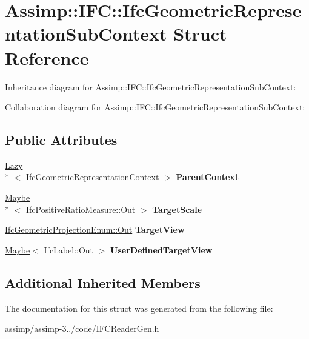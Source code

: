 \hypertarget{struct_assimp_1_1_i_f_c_1_1_ifc_geometric_representation_sub_context}{\section{Assimp\+:\+:I\+F\+C\+:\+:Ifc\+Geometric\+Representation\+Sub\+Context Struct Reference}
\label{struct_assimp_1_1_i_f_c_1_1_ifc_geometric_representation_sub_context}
}


Inheritance diagram for Assimp\+:\+:I\+F\+C\+:\+:Ifc\+Geometric\+Representation\+Sub\+Context\+:


Collaboration diagram for Assimp\+:\+:I\+F\+C\+:\+:Ifc\+Geometric\+Representation\+Sub\+Context\+:
\subsection*{Public Attributes}
\begin{DoxyCompactItemize}
\item 
\hypertarget{struct_assimp_1_1_i_f_c_1_1_ifc_geometric_representation_sub_context_aab43a1cb0afac7a62882cf3cb11165e7}{\hyperlink{struct_assimp_1_1_s_t_e_p_1_1_lazy}{Lazy}\\*
$<$ \hyperlink{struct_assimp_1_1_i_f_c_1_1_ifc_geometric_representation_context}{Ifc\+Geometric\+Representation\+Context} $>$ {\bfseries Parent\+Context}}\label{struct_assimp_1_1_i_f_c_1_1_ifc_geometric_representation_sub_context_aab43a1cb0afac7a62882cf3cb11165e7}

\item 
\hypertarget{struct_assimp_1_1_i_f_c_1_1_ifc_geometric_representation_sub_context_a759ce10e4674a6d10056294d9d585a1c}{\hyperlink{struct_assimp_1_1_s_t_e_p_1_1_maybe}{Maybe}\\*
$<$ Ifc\+Positive\+Ratio\+Measure\+::\+Out $>$ {\bfseries Target\+Scale}}\label{struct_assimp_1_1_i_f_c_1_1_ifc_geometric_representation_sub_context_a759ce10e4674a6d10056294d9d585a1c}

\item 
\hypertarget{struct_assimp_1_1_i_f_c_1_1_ifc_geometric_representation_sub_context_a2e43ba79ae1cc087ad11479871e7348e}{\hyperlink{classboost_1_1shared__ptr}{Ifc\+Geometric\+Projection\+Enum\+::\+Out} {\bfseries Target\+View}}\label{struct_assimp_1_1_i_f_c_1_1_ifc_geometric_representation_sub_context_a2e43ba79ae1cc087ad11479871e7348e}

\item 
\hypertarget{struct_assimp_1_1_i_f_c_1_1_ifc_geometric_representation_sub_context_ac6102011005bba587ce8399f59555ca7}{\hyperlink{struct_assimp_1_1_s_t_e_p_1_1_maybe}{Maybe}$<$ Ifc\+Label\+::\+Out $>$ {\bfseries User\+Defined\+Target\+View}}\label{struct_assimp_1_1_i_f_c_1_1_ifc_geometric_representation_sub_context_ac6102011005bba587ce8399f59555ca7}

\end{DoxyCompactItemize}
\subsection*{Additional Inherited Members}


The documentation for this struct was generated from the following file\+:\begin{DoxyCompactItemize}
\item 
assimp/assimp-\/3../code/I\+F\+C\+Reader\+Gen.\+h\end{DoxyCompactItemize}

